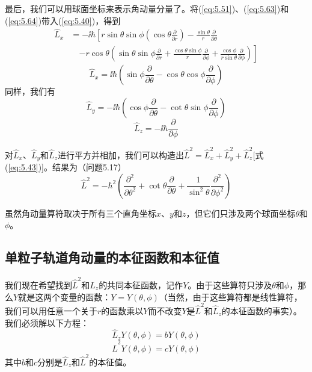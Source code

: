     最后，我们可以用球面坐标来表示角动量分量了。将(\ref{eq:5.51})、(\ref{eq:5.63})和(\ref{eq:5.64})带入(\ref{eq:5.40})，得到
    \begin{equation*}
        \begin{aligned}
            \hat{L}_x & = -\ii \hbar\left[r\sin\theta\sin\phi\left(\cos\theta\frac{\partial}{\partial r}\right) - \frac{\sin\theta}{r}\frac{\partial }{\partial\theta}\right.\\
            &  \quad \left.-r\cos\theta\left(\sin\theta\sin\phi\frac{\partial}{\partial r} +\frac{\cos\theta\sin\phi}{r}\frac{\partial}{\partial \phi}+\frac{\cos\phi}{r\sin\theta}\frac{\partial}{\partial \phi}\right)\right]
        \end{aligned}
    \end{equation*}
    \begin{equation}
        \hat{L}_x = \ii \hbar\left(\sin\phi\frac{\partial}{\partial \theta} - \cos\theta\cos\phi\frac{\partial}{\partial \phi}\right)
        \label{eq:5.65}
    \end{equation}
    同样，我们有
    \begin{equation}
        \hat{L}_y = -\ii \hbar\left(\cos\phi\frac{\partial}{\partial \theta} - \cot\theta\sin\phi\frac{\partial}{\partial \phi}\right)
        \label{eq:5.66}
    \end{equation}
    \begin{equation}
        \hat{L}_z = -\ii \hbar\frac{\partial}{\partial \phi}
        \label{eq:5.67}
    \end{equation}

    对$\hat{L}_x$、$\hat{L}_y$和$\hat{L}_z$进行平方并相加，我们可以构造出$\hat{L}^2 = \hat{L}_x^2 + \hat{L}_y^2 + \hat{L}_z^2$[式(\ref{eq:5.43})]。结果为（问题5.17）
    \begin{equation}
        \hat{L}^2 = -\hbar^2\left(\frac{\partial^2}{\partial\theta^2} + \cot\theta\frac{\partial}{\partial\theta} + \frac{1}{\sin^2\theta}\frac{\partial^2}{\partial \phi^2}\right)
        \label{eq:5.68}
    \end{equation}

    虽然角动量算符取决于所有三个直角坐标$x$、$y$和$z$，但它们只涉及两个球面坐标$\theta$和$\phi$。

\subsection*{单粒子轨道角动量的本征函数和本征值}
    我们现在希望找到$\hat{L}^2$和$\hat{L}_z$的共同本征函数，记作$Y$。由于这些算符只涉及$\theta$和$\phi$，那么$Y$就是这两个变量的函数：$Y = Y\left(\theta,\phi\right)$（当然，由于这些算符都是线性算符，我们可以用任意一个关于$r$的函数乘以$Y$而不改变$Y$是$\hat{L}^2$和$\hat{L}_z$的本征函数的事实）。我们必须解以下方程：
    \begin{equation}
        \hat{L}_zY\left(\theta,\phi\right) = bY\left(\theta,\phi\right)
        \label{eq:5.69}
    \end{equation}
    \begin{equation}
        \hat{L}^2Y\left(\theta,\phi\right) = cY\left(\theta,\phi\right)
        \label{eq:5.70}
    \end{equation}
    其中$b$和$c$分别是$\hat{L}_z$和$\hat{L}^2$的本征值。

